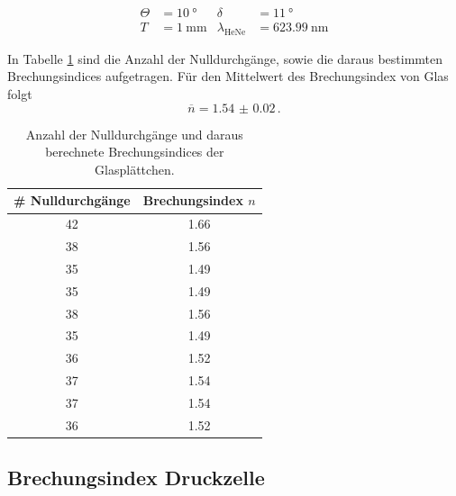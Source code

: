 \begin{align*}
  \Theta &= \SI{10}{\degree} & \delta &= \SI{11}{\degree} \\
  T &= \SI{1}{\milli\meter}  & \lambda_\text{HeNe} &= \SI{623.99}{\nano\meter}
\end{align*}

In Tabelle \ref{tab:Glas} sind die Anzahl der Nulldurchgänge, sowie die daraus bestimmten Brechungsindices aufgetragen. Für den Mittelwert des Brechungsindex von Glas folgt
\begin{equation}
  \overline{n} = \SI{1.54(2)} \, .
  \label{res:n_Glas}
\end{equation}

\begin{table}[H]
  \centering
  \caption{Anzahl der Nulldurchgänge und daraus berechnete Brechungsindices der Glasplättchen.}
  \label{tab:Glas}
  \begin{tabular}{cc}
    \toprule
    \# Nulldurchgänge & Brechungsindex $n$ \\
    \midrule
    42 & \num{1.66} \\
    38 & \num{1.56} \\
    35 & \num{1.49} \\
    35 & \num{1.49} \\
    38 & \num{1.56} \\
    35 & \num{1.49} \\
    36 & \num{1.52} \\
    37 & \num{1.54} \\
    37 & \num{1.54} \\
    36 & \num{1.52} \\
    \bottomrule
  \end{tabular}
\end{table}

\subsection{Brechungsindex Druckzelle}

